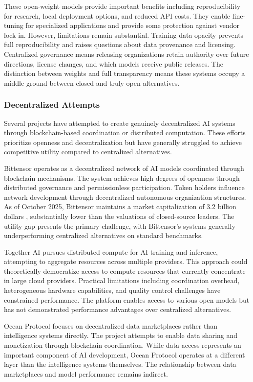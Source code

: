 These open-weight models provide important benefits including reproducibility for research, local deployment options, and reduced API costs. They enable fine-tuning for specialized applications and provide some protection against vendor lock-in. However, limitations remain substantial. Training data opacity prevents full reproducibility and raises questions about data provenance and licensing. Centralized governance means releasing organizations retain authority over future directions, license changes, and which models receive public releases. The distinction between weights and full transparency means these systems occupy a middle ground between closed and truly open alternatives.

\subsubsection{Decentralized Attempts}

Several projects have attempted to create genuinely decentralized AI systems through blockchain-based coordination or distributed computation. These efforts prioritize openness and decentralization but have generally struggled to achieve competitive utility compared to centralized alternatives.

Bittensor operates as a decentralized network of AI models coordinated through blockchain mechanisms. The system achieves high degrees of openness through distributed governance and permissionless participation. Token holders influence network development through decentralized autonomous organization structures. As of October 2025, Bittensor maintains a market capitalization of 3.2 billion dollars \cite{bittensor_cmc2025}, substantially lower than the valuations of closed-source leaders. The utility gap presents the primary challenge, with Bittensor's systems generally underperforming centralized alternatives on standard benchmarks.

Together AI pursues distributed compute for AI training and inference, attempting to aggregate resources across multiple providers. This approach could theoretically democratize access to compute resources that currently concentrate in large cloud providers. Practical limitations including coordination overhead, heterogeneous hardware capabilities, and quality control challenges have constrained performance. The platform enables access to various open models but has not demonstrated performance advantages over centralized alternatives.

Ocean Protocol focuses on decentralized data marketplaces rather than intelligence systems directly. The project attempts to enable data sharing and monetization through blockchain coordination. While data access represents an important component of AI development, Ocean Protocol operates at a different layer than the intelligence systems themselves. The relationship between data marketplaces and model performance remains indirect.

